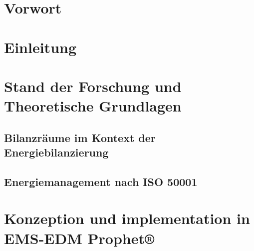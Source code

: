 \documentclass[a4paper,10pt,twoside]{report}
\begin{document}
\chapter*{Vorwort}
\tableofcontents

\chapter{Einleitung}
\setcounter{page}{1}














\chapter{Stand der Forschung und Theoretische Grundlagen}
\section{Bilanzräume im Kontext der Energiebilanzierung}



\section{Energiemanagement nach ISO 50001}








\chapter{Konzeption und implementation in EMS-EDM Prophet®}
\end{document}
